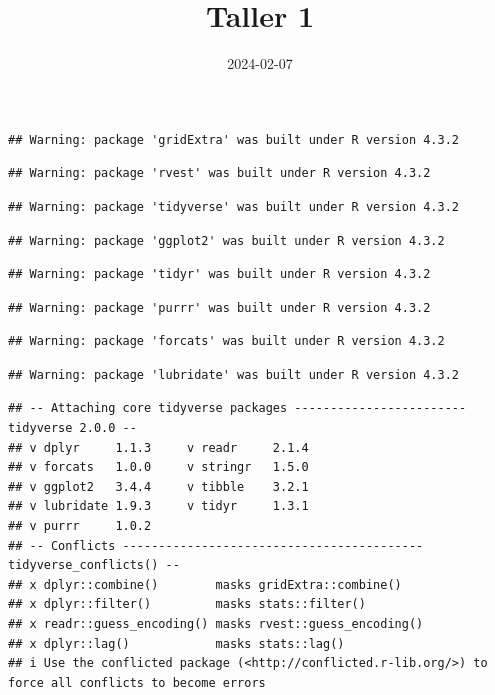 \documentclass[
]{article}
\title{Taller 1}
\author{}
\date{\vspace{-2.5em}2024-02-07}
\begin{document}
\maketitle

\begin{verbatim}
## Warning: package 'gridExtra' was built under R version 4.3.2
\end{verbatim}

\begin{verbatim}
## Warning: package 'rvest' was built under R version 4.3.2
\end{verbatim}

\begin{verbatim}
## Warning: package 'tidyverse' was built under R version 4.3.2
\end{verbatim}

\begin{verbatim}
## Warning: package 'ggplot2' was built under R version 4.3.2
\end{verbatim}

\begin{verbatim}
## Warning: package 'tidyr' was built under R version 4.3.2
\end{verbatim}

\begin{verbatim}
## Warning: package 'purrr' was built under R version 4.3.2
\end{verbatim}

\begin{verbatim}
## Warning: package 'forcats' was built under R version 4.3.2
\end{verbatim}

\begin{verbatim}
## Warning: package 'lubridate' was built under R version 4.3.2
\end{verbatim}

\begin{verbatim}
## -- Attaching core tidyverse packages ------------------------ tidyverse 2.0.0 --
## v dplyr     1.1.3     v readr     2.1.4
## v forcats   1.0.0     v stringr   1.5.0
## v ggplot2   3.4.4     v tibble    3.2.1
## v lubridate 1.9.3     v tidyr     1.3.1
## v purrr     1.0.2     
## -- Conflicts ------------------------------------------ tidyverse_conflicts() --
## x dplyr::combine()        masks gridExtra::combine()
## x dplyr::filter()         masks stats::filter()
## x readr::guess_encoding() masks rvest::guess_encoding()
## x dplyr::lag()            masks stats::lag()
## i Use the conflicted package (<http://conflicted.r-lib.org/>) to force all conflicts to become errors
\end{verbatim}
\end{document}
